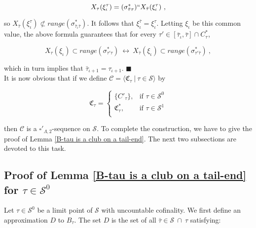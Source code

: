 \documentclass[12pt]{article}
\begin{document}
\[
X_\tau ( \xi_\iota^\tau ) = (\sigma_{\bar{\tau} \tau}^*)`` X_{\bar{\tau}} (\xi_\iota^\tau) \ ,
\]

so $X_{\bar{\tau}} ( \xi_\iota^\tau) \not\subset range (\sigma_{\bar{\tau}_\iota \bar{\tau} }^*)$.  It follows that $\xi_\iota^{\bar{\tau}} = \xi_\iota^\tau$.  Letting $\xi_\iota$ be this common value, the above formula guarantees that for every $\tau' \in [ \bar{\tau}_\iota , \bar{\tau} ] \cap C_\tau^*$,

\[
X_\tau ( \xi_\iota ) \subset range (\sigma_{\tau' \tau}^*) \ \leftrightarrow \ X_{\bar{\tau}} (\xi_\iota) \subset range ( \sigma_{\tau' \bar{\tau}}^*) \ ,
\]

which in turn implies that $\bar{\tau}_{\iota + 1} = \tau_{\iota + 1}$.  $\blacksquare$\\

It is now obvious that if we define $\mathcal{C} = \langle \mathfrak{C}_\tau \ | \ \tau \in \mathcal{S} \rangle$ by

\[
\mathfrak{C}_\tau =
\begin{cases}
\{ C'_\tau \} , & \text{if } \tau \in \mathcal{S}^0 \\
\mathfrak{C}_\tau^* , &  \text{if } \tau \in \mathcal{S}^1\\
\end{cases}
\]

then $\mathcal{C}$ is a $\square'_{\Lambda, 2}$-sequence on $\mathcal{S}$.  To complete the construction, we have to give the proof of Lemma \ref{B-tau is a club on a tail-end}.  The next two subsections are devoted to this task.\\








\subsection{Proof of Lemma \ref{B-tau is a club on a tail-end} for $\tau \in \mathcal{S}^0$}









Let $\tau \in \mathcal{S}^0$ be a limit point of $\mathcal{S}$ with uncountable cofinality.  We first define an approximation $D$ to $B_\tau$.  The set $D$ is the set of all $\bar{\tau} \in \mathcal{S} \ \cap \ \tau$ satisfying:\\
\end{document}
